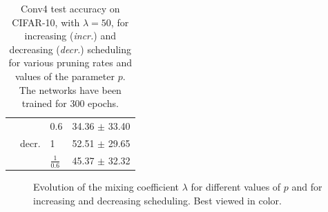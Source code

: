 \begin{table}[htbp]
\begin{tabular}{lllc}
        \cline{2-4}
                                   & \multirow{3}{*}{decr.}   & 0.6             & 34.36 $\pm$ 33.40           \\
                                   &                          & 1               & 52.51 $\pm$ 29.65           \\
                                   &                          & $\frac{1}{0.6}$ & 45.37 $\pm$ 32.32           \\
        \bottomrule
    \end{tabular}
    \caption{Conv4 test accuracy on CIFAR-10, with $\lambda=50$, for increasing
        (\emph{incr.}) and decreasing (\emph{decr.}) scheduling for various pruning
        rates and values of the parameter $p$. The networks have been trained for
        300 epochs.}
    \label{sec:appendix:annihiliation_table}
\end{table}


\begin{figure}[!h]
    \centering
    \caption{Evolution of the mixing coefficient $\lambda$ for different values
        of $p$ and for increasing and decreasing scheduling. Best viewed in color.}
    \label{fig:appendix:annihiliation_inc_dec}
\end{figure}

